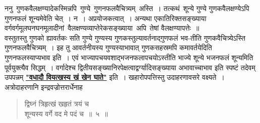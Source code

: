 \documentclass[11pt, openany]{book}
\begin{document}
\vspace{-3mm}
 ननु \,गुणकवैलक्षण्यादेकस्मिन्नपि \,गुण्ये \,गुणनफलवैचित्र्यम् \,अस्ति~। तत्कथं \,शून्ये गुण्ये गुणकवैलक्षण्येऽपि गुणनफलं शून्यमेवेति चेत्~। न~। अप्रयोजकत्वात्~। अन्यथा एकातिरिक्तसङ्ख्याया \,वर्गवर्गमूलघनघनमूलादीनां \,वैलक्षण्यव्याप्तेरेकसङ्ख्याया \,अपि \,तेषां वैलक्षण्यापत्तेः~॥ \\

\vspace{-3mm}
 वस्तुतस्तु गुणको ह्यावर्तकः सति गुण्ये गुण्यस्य गुणकस्तुल्यावर्तनाद्गुणफलं भव-तीति गुणकवैचित्र्येऽस्ति गुणनफलवैचित्र्यम्~। इह तु 
आवर्तनीयस्य गुण्यस्याभावात् गुणकसहस्रमपि कमावर्तयेदिति गुणनफलस्याप्यभाव इति~। एवं भाज्यापचयवशाद्भजनफलापचयोऽस्तीति भाज्ये शून्ये भजनफलं 
शून्यमिति पूर्वयुक्त्यैव सिद्धम्~। वर्गादेश्च द्वितीयसङ्ख्यानिरपेक्षत्वाद्वर्ग्यादिसङ्ख्याया अभावाच्चाभाव इति स्पष्टं तदेवम् उपपन्नम् \hyperref[1.5]{\textbf{"वधादौ वियत्खस्य खं खेन घाते"}} इति~। खहारोपपत्तिस्तु उदाहरणावसरे वक्ष्यते~। अत्रोदाहरणानि इन्द्रवज्रोत्तरार्धेनाह\textendash  

\newpage%
\begin{quote}
    \ex
     द्विघ्नं त्रिहृत्खं खहृतं त्रयं च \\
     
     \vspace{-7mm}
\hspace{1cm} शून्यस्य वर्गे वद मे पदं च~॥~५~॥ 
\end{quote}
\end{document}
